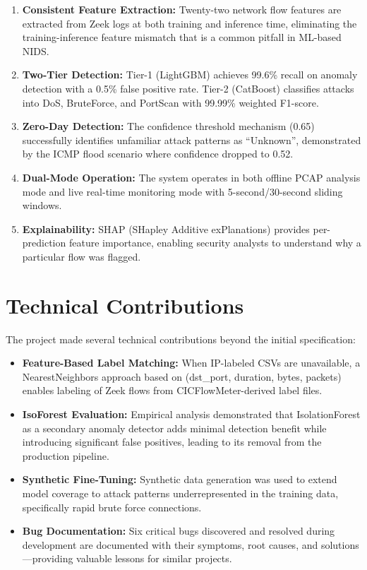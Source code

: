\documentclass[12pt,a4paper,twoside]{report}
\begin{document}
\begin{enumerate}[leftmargin=*]
    \item \textbf{Consistent Feature Extraction:} Twenty-two network flow features are extracted from Zeek logs at both training and inference time, eliminating the training-inference feature mismatch that is a common pitfall in ML-based NIDS.
    \item \textbf{Two-Tier Detection:} Tier-1 (LightGBM) achieves 99.6\% recall on anomaly detection with a 0.5\% false positive rate. Tier-2 (CatBoost) classifies attacks into DoS, BruteForce, and PortScan with 99.99\% weighted F1-score.
    \item \textbf{Zero-Day Detection:} The confidence threshold mechanism (0.65) successfully identifies unfamiliar attack patterns as ``Unknown'', demonstrated by the ICMP flood scenario where confidence dropped to 0.52.
    \item \textbf{Dual-Mode Operation:} The system operates in both offline PCAP analysis mode and live real-time monitoring mode with 5-second/30-second sliding windows.
    \item \textbf{Explainability:} SHAP (SHapley Additive exPlanations) provides per-prediction feature importance, enabling security analysts to understand why a particular flow was flagged.
\end{enumerate}

\section{Technical Contributions}

The project made several technical contributions beyond the initial specification:

\begin{itemize}
    \item \textbf{Feature-Based Label Matching:} When IP-labeled CSVs are unavailable, a NearestNeighbors approach based on (dst\_port, duration, bytes, packets) enables labeling of Zeek flows from CICFlowMeter-derived label files.
    \item \textbf{IsoForest Evaluation:} Empirical analysis demonstrated that IsolationForest as a secondary anomaly detector adds minimal detection benefit while introducing significant false positives, leading to its removal from the production pipeline.
    \item \textbf{Synthetic Fine-Tuning:} Synthetic data generation was used to extend model coverage to attack patterns underrepresented in the training data, specifically rapid brute force connections.
    \item \textbf{Bug Documentation:} Six critical bugs discovered and resolved during development are documented with their symptoms, root causes, and solutions—providing valuable lessons for similar projects.
\end{itemize}
\end{document}
